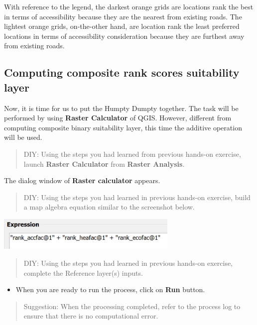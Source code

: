 \documentclass[
  letterpaper,
  DIV=11,
  numbers=noendperiod]{scrreprt}
\providecommand{\tightlist}{%
  \setlength{\itemsep}{0pt}\setlength{\parskip}{0pt}}\usepackage{longtable,booktabs,array}
\begin{document}
With reference to the legend, the darkest orange grids are locations
rank the best in terms of accessibility because they are the nearest
from existing roads. The lightest orange grids, on-the-other hand, are
location rank the least preferred locations in terms of accessibility
consideration because they are furthest away from existing roads.

\hypertarget{computing-composite-rank-scores-suitability-layer}{%
\subsection{Computing composite rank scores suitability
layer}\label{computing-composite-rank-scores-suitability-layer}}

Now, it is time for us to put the Humpty Dumpty together. The task will
be performed by using \textbf{Raster Calculator} of QGIS. However,
different from computing composite binary suitability layer, this time
the additive operation will be used.

\begin{quote}
DIY: Using the steps you had learned from previous hands-on exercise,
launch \textbf{Raster Calculator} from \textbf{Raster Analysis}.
\end{quote}

The dialog window of \textbf{Raster calculator} appears.

\begin{quote}
DIY: Using the steps you had learned in previous hands-on exercise,
build a map algebra equation similar to the screenshot below.
\end{quote}

\includegraphics[width=0.65\textwidth,height=\textheight]{./img08/image9.jpg}

\begin{quote}
DIY: Using the steps you had learned in previous hands-on exercise,
complete the Reference layer(s) inputs.
\end{quote}

\begin{itemize}
\tightlist
\item
  When you are ready to run the process, click on \textbf{Run} button.
\end{itemize}

\begin{quote}
Suggestion: When the processing completed, refer to the process log to
ensure that there is no computational error.
\end{quote}
\end{document}
